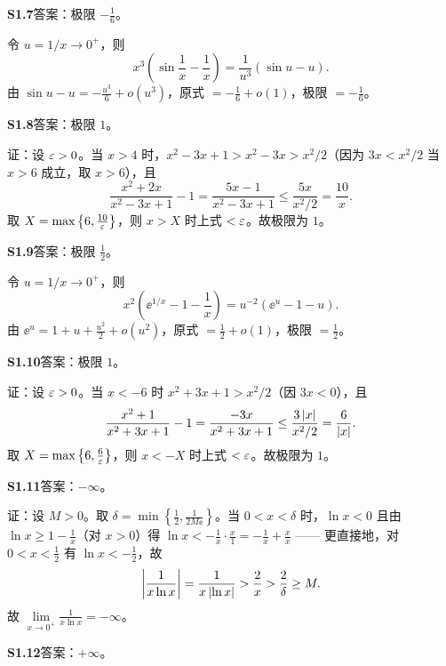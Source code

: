 \medskip
\noindent\textbf{S1.7}\quad 答案：极限 $-\frac16$。

令 $u=1/x\to0^{+}$，则
\[
x^{3}\left(\sin\frac1x-\frac1x\right)=\frac{1}{u^{3}}(\sin u-u).
\]
由 $\sin u-u=-\frac{u^{3}}6+o(u^{3})$，原式 $=-\frac16+o(1)$，极限 $=-\frac16$。

\medskip
\noindent\textbf{S1.8}\quad 答案：极限 $1$。

证：设 $\varepsilon>0$。当 $x>4$ 时，$x^{2}-3x+1>x^{2}-3x>x^{2}/2$（因为 $3x< x^{2}/2$ 当 $x>6$ 成立，取 $x>6$），且
\[
\frac{x^{2}+2x}{x^{2}-3x+1}-1=\frac{5x-1}{x^{2}-3x+1}\leq\frac{5x}{x^{2}/2}=\frac{10}{x}.
\]
取 $X=\max\left\{6,\frac{10}{\varepsilon}\right\}$，则 $x>X$ 时上式 $<\varepsilon$。故极限为 $1$。

\medskip
\noindent\textbf{S1.9}\quad 答案：极限 $\frac12$。

令 $u=1/x\to0^{+}$，则
\[
x^{2}\left(\ee^{1/x}-1-\frac1x\right)=u^{-2}(\ee^{u}-1-u).
\]
由 $\ee^{u}=1+u+\frac{u^{2}}2+o(u^{2})$，原式 $=\frac12+o(1)$，极限 $=\frac12$。

\medskip
\noindent\textbf{S1.10}\quad 答案：极限 $1$。

证：设 $\varepsilon>0$。当 $x<-6$ 时 $x^{2}+3x+1>x^{2}/2$（因 $3x<0$），且
\[
\frac{x^{2}+1}{x^{2}+3x+1}-1=\frac{-3x}{x^{2}+3x+1}\leq\frac{3\left\lvert x\right\rvert}{x^{2}/2}=\frac{6}{\left\lvert x\right\rvert}.
\]
取 $X=\max\left\{6,\frac6{\varepsilon}\right\}$，则 $x<-X$ 时上式 $<\varepsilon$。故极限为 $1$。

\medskip
\noindent\textbf{S1.11}\quad 答案：$-\infty$。

证：设 $M>0$。取 $\delta=\min\left\{\frac{1}{2},\frac{1}{2M\ee}\right\}$。当 $0<x<\delta$ 时，$\ln x<0$ 且由 $\ln x\geq1-\frac1x$（对 $x>0$）得 $\ln x<-\frac{1}{x}\cdot\frac{x}{1}= -\frac1x+\frac{x}{x}$ —— 更直接地，对 $0<x<\frac12$ 有 $\ln x<-\frac12$，故
\[
\left\lvert \frac{1}{x\ln x}\right\rvert=\frac{1}{x\left\lvert \ln x\right\rvert}>\frac{2}{x}>\frac{2}{\delta}\geq M.
\]
故 $\lim\limits_{x\to0^{+}}\frac{1}{x\ln x}=-\infty$。

\medskip
\noindent\textbf{S1.12}\quad 答案：$+\infty$。

